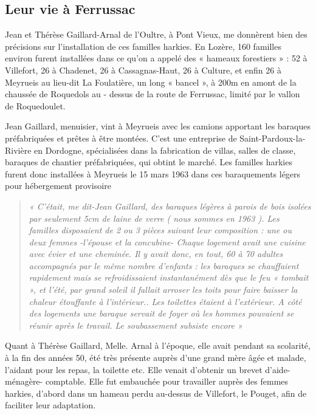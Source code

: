 \subsection{Leur vie à Ferrussac}

Jean et Thérèse Gaillard-Arnal de l’Oultre, à Pont Vieux, me donnèrent bien des
précisions sur l’installation de ces familles harkies. En Lozère, 160 familles environ
furent installées dans ce qu’on a appelé des « hameaux forestiers » : 52 à Villefort, 26
à Chadenet, 26 à Cassagnas-Haut, 26 à Culture, et enfin 26 à Meyrueis au lieu-dit La
Foulatière, un long « bancel », à 200m en amont de la chaussée de Roquedols au -
dessus de la route de Ferrussac, limité par le vallon de Roquedoulet.

Jean Gaillard, menuisier, vint à Meyrueis avec les camions apportant les baraques
préfabriquées et prêtes à être montées. C’est une entreprise de Saint-Pardoux-la-
Rivière en Dordogne, spécialisées dans la fabrication de villas, salles de classe,
baraques de chantier préfabriquées, qui obtint le marché.
Les familles harkies furent donc installées à Meyrueis le 15 mars 1963 dans ces
baraquements légers pour hébergement provisoire

\begin{quote}
\textit{« C’était, me dit-Jean Gaillard, des baraques légères à parois de bois isolées par
seulement 5cm de laine de verre ( nous sommes en 1963 ). Les familles disposaient de
2 ou 3 pièces suivant leur composition : une ou deux femmes -l’épouse et la
concubine- Chaque logement avait une cuisine avec évier et une cheminée. Il y avait
donc, en tout, 60 à 70 adultes accompagnés par le même nombre d’enfants : les
baraques se chauffaient rapidement mais se refroidissaient instantanément dès que le
feu « tombait », et l’été, par grand soleil il fallait arroser les toits pour faire baisser
la chaleur étouffante à l’intérieur.. Les toilettes étaient à l’extérieur. A côté des
logements une baraque servait de foyer où les hommes pouvaient se réunir après le
travail. Le soubassement subsiste encore »}
\end{quote}

Quant à Thérèse Gaillard, Melle. Arnal à l’époque, elle avait pendant sa scolarité, à la
fin des années 50, été très présente auprès d’une grand mère âgée et malade, l’aidant
pour les repas, la toilette etc. Elle venait d’obtenir un brevet d’aide-ménagère-
comptable. Elle fut embauchée pour travailler auprès des femmes harkies, d’abord
dans un hameau perdu au-dessus de Villefort, le Pouget, afin de faciliter leur
adaptation.

